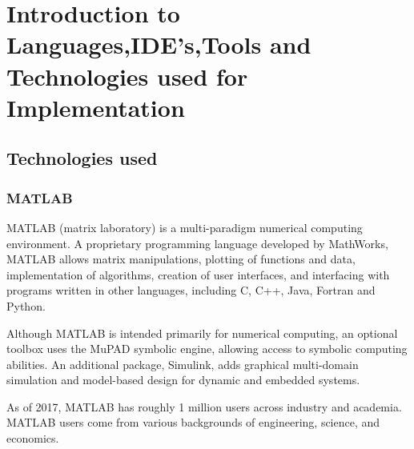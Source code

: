 \section{Introduction to Languages,IDE’s,Tools and Technologies used for Implementation}
	
\subsection{Technologies used}

\subsubsection{MATLAB}
 MATLAB (matrix laboratory) is a multi-paradigm numerical computing environment. A proprietary programming language developed by MathWorks, MATLAB allows matrix manipulations, plotting of functions and data, implementation of algorithms, creation of user interfaces, and interfacing with programs written in other languages, including C, C++, Java, Fortran and Python.

Although MATLAB is intended primarily for numerical computing, an optional toolbox uses the MuPAD symbolic engine, allowing access to symbolic computing abilities. An additional package, Simulink, adds graphical multi-domain simulation and model-based design for dynamic and embedded systems.

As of 2017, MATLAB has roughly 1 million users across industry and academia. MATLAB users come from various backgrounds of engineering, science, and economics.


